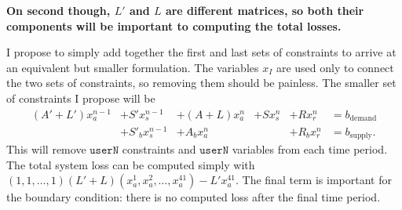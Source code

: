 \documentclass[11pt]{article}
\newcommand{\userN}{\texttt{userN}}
\begin{document}
\textbf{
	On second though, $L'$ and $L$ are different matrices, so both their components will be important to computing the total losses.
}

I propose to simply add together the first and last sets of constraints to arrive at an equivalent but smaller formulation.
The variables $x_I$ are used only to connect the two sets of constraints, so removing them should be painless.
The smaller set of constraints I propose will be
\[
	\begin{array}{rrrrrl}
		(A'+L') x^{n-1}_a & + S' x^{n-1}_s   & + (A+L) x^n_a   & + S x^n_s & + R x^n_r   & = b_\text{demand} \\
		                  & + S'_b x^{n-1}_s & + A_b x^n_a     &           & + R_b x^n_r & = b_\text{supply}.
	\end{array}
\]
This will remove $\userN$ constraints and $\userN$ variables from each time period.
The total system loss can be computed simply with $(1, 1, \dots, 1) (L'+L) (x^1_a, x^2_a, \dots, x^{41}_a) - L' x^{41}_a$.
The final term is important for the boundary condition: there is no computed loss after the final time period.
\end{document}
